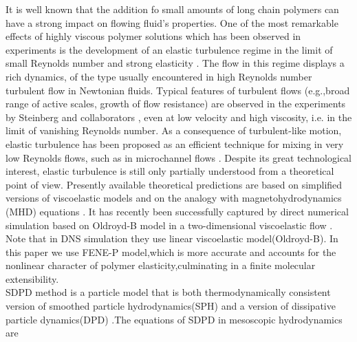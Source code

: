 \documentclass[aps,pre,twocolumn,showpacs,superscriptaddress,groupedaddress]{revtex4}  %
\begin{document}
It is well known that the addition fo small amounts of long chain polymers can have a strong impact on flowing fluid's properties.
One of the most remarkable effects of highly viscous polymer solutions which has been
observed in experiments is the development of an elastic turbulence regime in the limit of small Reynolds number and strong 
elasticity \cite{groisman00}. The flow in this regime displays a rich dynamics, of the type usually encountered
in high Reynolds number turbulent flow in Newtonian fluids. Typical features of turbulent flows (e.g.,broad
range of active scales, growth of flow resistance) are observed in the experiments by Steinberg and collaborators \cite{groisman00},
even at low velocity and high viscosity, i.e. in the limit of vanishing Reynolds number. As a consequence of 
turbulent-like motion, elastic turbulence has been proposed as an efficient technique for mixing in very
low Reynolds flows, such as in microchannel flows \cite{groisman01}. Despite its great technological interest, elastic turbulence
is still only partially understood from a theoretical point of view. Presently available theoretical predictions are
based on simplified versions of viscoelastic models and on the analogy with magnetohydrodynamics (MHD) equations \cite{balk01}\cite{fouxon03}. 
It has recently been successfully captured by direct numerical simulation based on Oldroyd-B model in a two-dimensional viscoelastic flow \cite{berti08}.
Note that in DNS simulation they use linear viscoelastic model(Oldroyd-B). In this paper we use FENE-P model,which is more accurate and accounts for the nonlinear character of polymer
elasticity,culminating in a finite molecular extensibility\cite{bird87}.\\
SDPD method is a particle model that is both thermodynamically consistent version of smoothed particle hydrodynamics(SPH) and a version of dissipative particle dynamics(DPD)
\cite{pep03}.The equations of SDPD in mesoscopic hydrodynamics are \cite{hu06}
\end{document}
